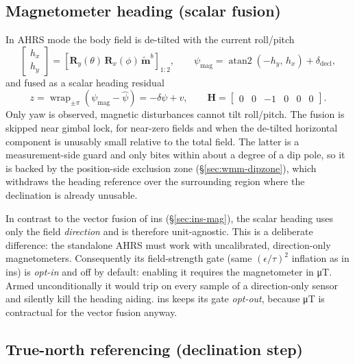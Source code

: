 \documentclass[11pt,a4paper]{article}
\newcommand{\vect}[1]{\bm{#1}}
\newcommand{\mat}[1]{\bm{#1}}
\newcommand{\bframe}{b}
\begin{document}
\subsection{Magnetometer heading (scalar fusion)}
\label{sec:ahrs-mag}

In AHRS mode the body field is de-tilted with the current roll/pitch
\cite[Sec.~10.1]{wendel2011}
\begin{equation}
  \begin{bmatrix} h_x \\ h_y \end{bmatrix}
  = \left[\mat{R}_y(\theta)\,\mat{R}_x(\phi)\,
    \tilde{\vect{m}}^\bframe\right]_{1:2},
  \qquad
  \psi_{\text{mag}} = \operatorname{atan2}(-h_y,\, h_x) + \delta_{\text{decl}} ,
\end{equation}
and fused as a scalar heading residual
\begin{equation}
  z = \operatorname{wrap}_{\pm\pi}(\psi_{\text{mag}} - \hat\psi)
    = -\delta\psi + v,
  \qquad
  \mat{H} = \begin{bmatrix} 0 & 0 & -1 & 0 & 0 & 0 \end{bmatrix}.
\end{equation}
Only yaw is observed, magnetic disturbances cannot tilt roll/pitch.
The fusion is skipped near gimbal lock, for near-zero fields and when the
de-tilted horizontal component is unusably small relative to the total
field. The latter is a measurement-side guard and only bites within
about a degree of a dip pole, so it is backed by the position-side
exclusion zone (\S\ref{sec:wmm-dipzone}), which withdraws the heading
reference over the surrounding region where the declination is already
unusable.

In contrast to the vector fusion of ins (\S\ref{sec:ins-mag}), the scalar
heading uses only the field \emph{direction} and is therefore
unit-agnostic. This is a deliberate difference: the standalone AHRS must work
with uncalibrated, direction-only magnetometers. Consequently its
field-strength gate (same $(\epsilon/\tau)^2$ inflation as in ins) is
\emph{opt-in} and off by default: enabling it requires the magnetometer
in \si{\micro\tesla}. Armed unconditionally it would trip on every
sample of a direction-only sensor and silently kill the heading aiding.
ins keeps its gate \emph{opt-out}, because \si{\micro\tesla} is
contractual for the vector fusion anyway.

\subsection{True-north referencing (declination step)}
\end{document}
